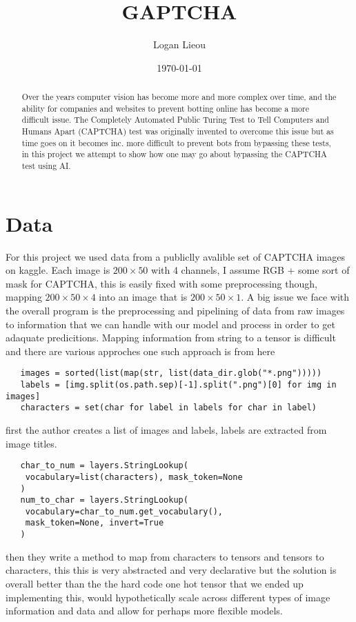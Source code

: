 \documentclass[11pt]{article}
\title{GAPTCHA}
\author{Logan Lieou}
\date{\today}
\begin{document}
\maketitle{}
\newpage

\begin{abstract}
   Over the years computer vision has become more and more complex over time, and the ability for companies and websites to prevent botting online has become a more difficult issue. The Completely Automated Public Turing Test to Tell Computers and Humans Apart (CAPTCHA) test was originally invented to overcome this issue but as time goes on it becomes inc. more difficult to prevent bots from bypassing these tests, in this project we attempt to show how one may go about bypassing the CAPTCHA test using AI.
\end{abstract}

\section{Data}
For this project we used data from a publiclly avalible set of CAPTCHA images on kaggle. Each image is $200\times{}50$ with 4 channels, I assume RGB + some sort of mask for CAPTCHA, this is easily fixed with some preprocessing though, mapping $200\times{}50\times{}4$ into an image that is $200\times{}50\times{}1$. A big issue we face with the overall program is the preprocessing and pipelining of data from raw images to information that we can handle with our model and process in order to get adaquate predicitions. Mapping information from string to a tensor is difficult and there are various approches one such approach is from here \cite{a2019}

\begin{verbatim}
   images = sorted(list(map(str, list(data_dir.glob("*.png")))))
   labels = [img.split(os.path.sep)[-1].split(".png")[0] for img in images]
   characters = set(char for label in labels for char in label)
\end{verbatim}
first the author creates a list of images and labels, labels are extracted from image titles.
\begin{verbatim}
   char_to_num = layers.StringLookup(
    vocabulary=list(characters), mask_token=None
   )
   num_to_char = layers.StringLookup(
    vocabulary=char_to_num.get_vocabulary(), 
    mask_token=None, invert=True
   )
\end{verbatim}
then they write a method to map from characters to tensors and tensors to characters, this this is very abstracted and very declarative but the solution is overall better than the the hard code one hot tensor that we ended up implementing this, would hypothetically scale across different types of image information and data and allow for perhaps more flexible models.
\end{document}
